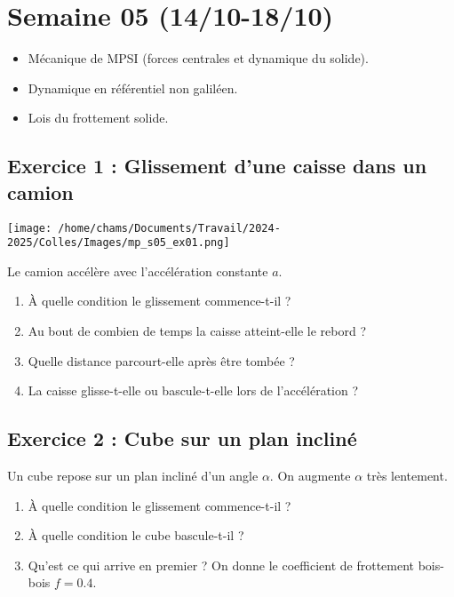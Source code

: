 \section{Semaine 05 (14/10-18/10) }

\begin{itemize}
	\item Mécanique de MPSI (forces centrales et dynamique du solide).
	\item Dynamique en référentiel non galiléen.
	\item Lois du frottement solide.
\end{itemize}

\subsection{Exercice 1 : Glissement d'une caisse dans un camion}

\begin{minipage}[c]{\linewidth/2}
	\texttt{[image: /home/chams/Documents/Travail/2024-2025/Colles/Images/mp\_s05\_ex01.png]}
\end{minipage}%
\begin{minipage}[c]{\linewidth/2}
	Le camion accélère avec l'accélération constante $a$.
	\begin{enumerate}
		\item À quelle condition le glissement commence-t-il ?
		\item Au bout de combien de temps la caisse atteint-elle le rebord ?
		\item Quelle distance parcourt-elle après être tombée ?
		\item La caisse glisse-t-elle ou bascule-t-elle lors de l'accélération ?
	\end{enumerate}
\end{minipage}

\subsection{Exercice 2 : Cube sur un plan incliné}

Un cube repose sur un plan incliné d'un angle $\alpha$. On augmente $\alpha$ très lentement.

\begin{enumerate}
	\item À quelle condition le glissement commence-t-il ?
	\item À quelle condition le cube bascule-t-il ?
	\item Qu'est ce qui arrive en premier ? On donne le coefficient de frottement bois-bois $f = 0.4$.
\end{enumerate}

